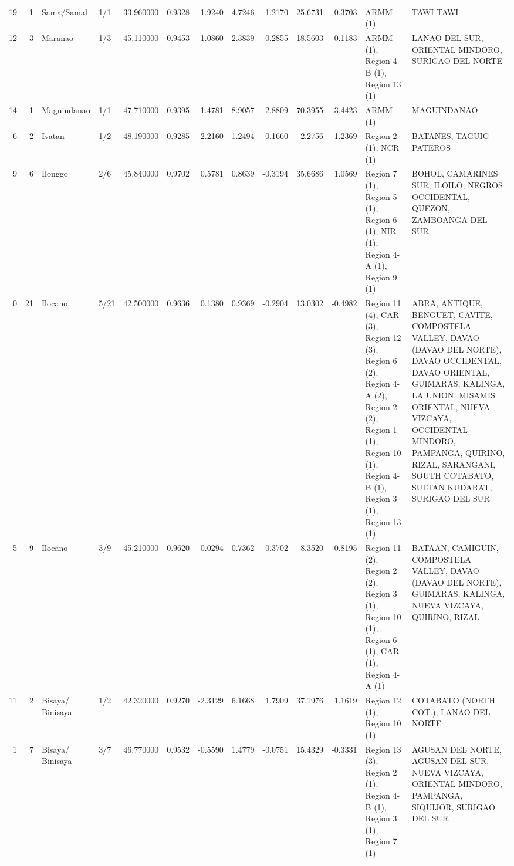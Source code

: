 \begin{tabular}{rrllrrrrrrrll}
19 & 1 & Sama/Samal & 1/1 & {\cellcolor[HTML]{779AF7}} \color[HTML]{F1F1F1} 33.960000 & 0.9328 & -1.9240 & 4.7246 & 1.2170 & 25.6731 & 0.3703 & ARMM (1) & TAWI-TAWI \\
12 & 3 & Maranao & 1/3 & {\cellcolor[HTML]{F6A385}} \color[HTML]{000000} 45.110000 & 0.9453 & -1.0860 & 2.3839 & 0.2855 & 18.5603 & -0.1183 & ARMM (1), Region 4-B (1), Region 13 (1) & LANAO DEL SUR, ORIENTAL MINDORO, SURIGAO DEL NORTE \\
14 & 1 & Maguindanao & 1/1 & {\cellcolor[HTML]{E36C55}} \color[HTML]{F1F1F1} 47.710000 & 0.9395 & -1.4781 & 8.9057 & 2.8809 & 70.3955 & 3.4423 & ARMM (1) & MAGUINDANAO \\
6 & 2 & Ivatan & 1/2 & {\cellcolor[HTML]{DE614D}} \color[HTML]{F1F1F1} 48.190000 & 0.9285 & -2.2160 & 1.2494 & -0.1660 & 2.2756 & -1.2369 & Region 2 (1), NCR (1) & BATANES, TAGUIG - PATEROS \\
9 & 6 & Ilonggo & 2/6 & {\cellcolor[HTML]{F39577}} \color[HTML]{000000} 45.840000 & 0.9702 & 0.5781 & 0.8639 & -0.3194 & 35.6686 & 1.0569 & Region 7 (1), Region 5 (1), Region 6 (1), NIR (1), Region 4-A (1), Region 9 (1) & BOHOL, CAMARINES SUR, ILOILO, NEGROS OCCIDENTAL, QUEZON, ZAMBOANGA DEL SUR \\
0 & 21 & Ilocano & 5/21 & {\cellcolor[HTML]{F2CBB7}} \color[HTML]{000000} 42.500000 & 0.9636 & 0.1380 & 0.9369 & -0.2904 & 13.0302 & -0.4982 & Region 11 (4), CAR (3), Region 12 (3), Region 6 (2), Region 4-A (2), Region 2 (2), Region 1 (1), Region 10 (1), Region 4-B (1), Region 3 (1), Region 13 (1) & ABRA, ANTIQUE, BENGUET, CAVITE, COMPOSTELA VALLEY, DAVAO (DAVAO DEL NORTE), DAVAO OCCIDENTAL, DAVAO ORIENTAL, GUIMARAS, KALINGA, LA UNION, MISAMIS ORIENTAL, NUEVA VIZCAYA, OCCIDENTAL MINDORO, PAMPANGA, QUIRINO, RIZAL, SARANGANI, SOUTH COTABATO, SULTAN KUDARAT, SURIGAO DEL SUR \\
5 & 9 & Ilocano & 3/9 & {\cellcolor[HTML]{F6A283}} \color[HTML]{000000} 45.210000 & 0.9620 & 0.0294 & 0.7362 & -0.3702 & 8.3520 & -0.8195 & Region 11 (2), Region 2 (2), Region 3 (1), Region 10 (1), Region 6 (1), CAR (1), Region 4-A (1) & BATAAN, CAMIGUIN, COMPOSTELA VALLEY, DAVAO (DAVAO DEL NORTE), GUIMARAS, KALINGA, NUEVA VIZCAYA, QUIRINO, RIZAL \\
11 & 2 & Bisaya/ Binisaya & 1/2 & {\cellcolor[HTML]{F1CDBA}} \color[HTML]{000000} 42.320000 & 0.9270 & -2.3129 & 6.1668 & 1.7909 & 37.1976 & 1.1619 & Region 12 (1), Region 10 (1) & COTABATO (NORTH COT.), LANAO DEL NORTE \\
1 & 7 & Bisaya/ Binisaya & 3/7 & {\cellcolor[HTML]{EC8165}} \color[HTML]{F1F1F1} 46.770000 & 0.9532 & -0.5590 & 1.4779 & -0.0751 & 15.4329 & -0.3331 & Region 13 (3), Region 2 (1), Region 4-B (1), Region 3 (1), Region 7 (1) & AGUSAN DEL NORTE, AGUSAN DEL SUR, NUEVA VIZCAYA, ORIENTAL MINDORO, PAMPANGA, SIQUIJOR, SURIGAO DEL SUR \\

\end{tabular}
